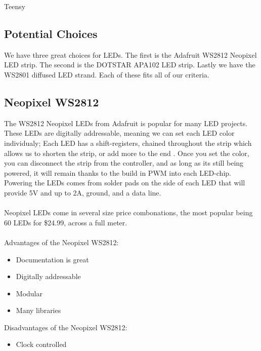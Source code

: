 Teensy\documentclass[onecolumn, draftclsnofoot,10pt, compsoc]{IEEEtran}
\begin{document}
		\subsection{Potential Choices}
		We have three great choices for LEDs. The first is the Adafruit
		WS2812 Neopixel LED strip. The second is the DOTSTAR APA102 LED strip.
		Lastly we have the WS2801 diffused LED strand. Each of these fits all of
		our criteria.
		\subsection{Neopixel WS2812}
		The WS2812 Neopixel LEDs from Adafruit is popular for many LED projects.
		These LEDs are digitally addressable, meaning we can set each LED color
		individualy; Each LED has a shift-registers, chained throughout the strip
		which allows us to shorten the strip, or add more to the end
		\cite[Pg 2]{neo}. Once you set the color, you can disconnect the strip from
		the controller, and as long as its still being powered, it will remain
		thanks to the build in PWM into each LED-chip. Powering the LEDs comes
		from solder pads on the side of each LED that will provide 5V and up to 2A,
		ground, and a data line.
		\\\\
		Neopixel LEDs come in several size price combonations, the most popular
		being 60 LEDs for \$24.99, across a full meter.
		\\\\
		Advantages of the Neopixel WS2812:
		\begin{itemize}
			\item Documentation is great
			\item Digitally addressable
			\item Modular
			\item Many libraries
		\end{itemize}
		Disadvantages of the Neopixel WS2812:
		\begin{itemize}
			\item Clock controlled
		\end{itemize}
\end{document}
